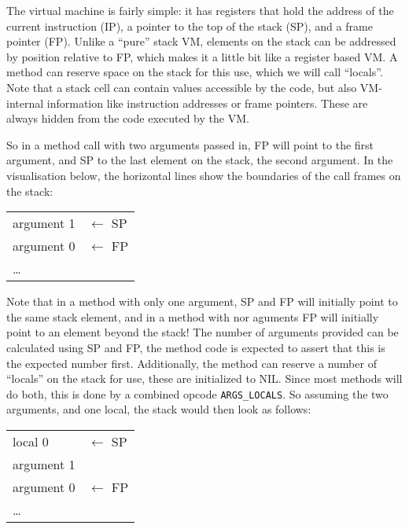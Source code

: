 \documentclass[12pt,a4paper]{article}
\begin{document}
The virtual machine is fairly simple: it has registers that hold the address of the current instruction (IP), a pointer to the top of the stack (SP), and a frame pointer (FP). Unlike a ``pure'' stack VM, elements on the stack can be addressed by position relative to FP, which makes it a little bit like a register based VM. A method can reserve space on the stack for this use, which we will call ``locals''. Note that a stack cell can contain values accessible by the code, but also VM-internal information like instruction addresses or frame pointers. These are always hidden from the code executed by the VM.

So in a method call with two arguments passed in, FP will point to the first argument, and SP to the last element on the stack, the second argument. In the visualisation below, the horizontal lines show the boundaries of the call frames on the stack:

\begin{table}[H]
\centering
\begin{tabular}{|p{3cm}|p{3cm}}
argument 1 & $\leftarrow$ SP \\
argument 0 & $\leftarrow$ FP \\
\cline{1-1}
\ldots & \\
\end{tabular}
\end{table}

Note that in a method with only one argument, SP and FP will initially point to the same stack element, and in a method with nor aguments FP will initially point to an element beyond the stack! The number of arguments provided can be calculated using SP and FP, the method code is expected to assert that this is the expected number first. Additionally, the method can reserve a number of ``locals'' on the stack for use, these are initialized to NIL. Since most methods will do both, this is done by a combined opcode \verb|ARGS_LOCALS|. So assuming the two arguments, and one local, the stack would then look as follows:

\begin{table}[H]
\centering
\begin{tabular}{|p{3cm}|p{3cm}}
local 0 & $\leftarrow$ SP \\
argument 1 \\ 
argument 0 & $\leftarrow$ FP \\
\cline{1-1}
\ldots & \\
\end{tabular}
\end{table}
\end{document}

